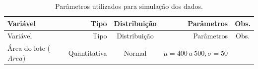 \documentclass[
  a4paper, 11pt]{article}
\begin{document}
\begin{longtable}[]{@{}lrcrc@{}}
\caption{Parâmetros utilizados para simulação dos dados.}\tabularnewline
\toprule
\begin{minipage}[b]{0.22\columnwidth}\raggedright
Variável\strut
\end{minipage} & \begin{minipage}[b]{0.10\columnwidth}\raggedleft
Tipo\strut
\end{minipage} & \begin{minipage}[b]{0.10\columnwidth}\centering
Distribuição\strut
\end{minipage} & \begin{minipage}[b]{0.25\columnwidth}\raggedleft
Parâmetros\strut
\end{minipage} & \begin{minipage}[b]{0.19\columnwidth}\centering
Obs.\strut
\end{minipage}\tabularnewline
\midrule
\endfirsthead
\toprule
\begin{minipage}[b]{0.22\columnwidth}\raggedright
Variável\strut
\end{minipage} & \begin{minipage}[b]{0.10\columnwidth}\raggedleft
Tipo\strut
\end{minipage} & \begin{minipage}[b]{0.10\columnwidth}\centering
Distribuição\strut
\end{minipage} & \begin{minipage}[b]{0.25\columnwidth}\raggedleft
Parâmetros\strut
\end{minipage} & \begin{minipage}[b]{0.19\columnwidth}\centering
Obs.\strut
\end{minipage}\tabularnewline
\midrule
\endhead
\begin{minipage}[t]{0.22\columnwidth}\raggedright
Área do lote (\(Area\))\strut
\end{minipage} & \begin{minipage}[t]{0.10\columnwidth}\raggedleft
Quantitativa\strut
\end{minipage} & \begin{minipage}[t]{0.10\columnwidth}\centering
Normal\strut
\end{minipage} & \begin{minipage}[t]{0.25\columnwidth}\raggedleft
\(\mu = 400 \ a \ 500, \sigma = 50\)\strut
\end{minipage} & \begin{minipage}[t]{0.19\columnwidth}\centering

\end{minipage}
\end{longtable}
\end{document}
